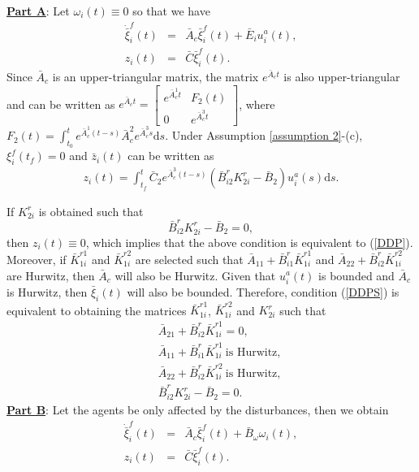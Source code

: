 \documentclass[12pt,draftcls,onecolumn]{IEEEtran}
\begin{document}
\underline{\textbf{Part A}}: Let  $\omega_i(t)\equiv 0$ so that we have
\begin{eqnarray*}
\dot{\bar \xi}_i^f(t)&=&\bar A_c\bar\xi_i^f(t)+\bar E_iu_i^a(t),\\
 z_i(t)&=&\bar C\bar \xi_i^f(t).\nonumber
\end{eqnarray*}
Since $\bar A_c$ is an upper-triangular matrix, the matrix $e^{\bar A_ct}$ is also upper-triangular and can be written  as 
$e^{\bar A_ct}=\begin{bmatrix}e^{\bar A_c^1t}&F_2(t)\\0&e^{\bar A_c^3t} \end{bmatrix}$, where $F_2(t)=\int_{t_0}^{t}e^{\bar A_c^1(t-s)}\bar A_c^2e^{\bar A_c^3s}\text{d}s$. Under Assumption \ref{assumption 2}-(c), $\xi_i^f(t_f)=0$ and $\bar z_i(t)$ can be written as 
\begin{eqnarray}
 z_i(t)=\int_{t_f}^{t}\bar C_2e^{\bar A_c^3(t-s)}(\bar B_{i2}^rK_{2i}^{r}-\bar B_2)u_i^{a}(s) \text{d}s. \label{eq. 2.9}
\end{eqnarray}\par
If $ K_{2i}^{r}$ is obtained such that 
$$\bar B_{i2}^rK_{2i}^{r}-\bar B_2=0,$$
then  $ z_i(t)\equiv 0$, which implies that the above condition is equivalent to (\ref{DDP}). Moreover, if $\bar K_{1i}^{r1}$ and $\bar K_{1i}^{r2}$ are selected such that $\bar A_{11}+\bar B_{i1}^r \bar K_{1i}^{r1}$ and $ \bar A_{22}+\bar B_{i2 }^r\bar K_{1i}^{r2}$ are Hurwitz, then $\bar A_c$ will also be Hurwitz. Given that $u_i^a(t)$ is bounded and $\bar A_c$ is Hurwitz, then $\bar \xi_i(t)$ will also be bounded. Therefore, condition (\ref{DDPS}) is equivalent  to  obtaining the matrices $\bar K_{1i}^{r1}$, $\bar K_{1i}^{r2}$ and $K_{2i}^{r}$  such that
\begin{eqnarray}
&&\bar A_{21}+\bar B_{i2}^r \bar K_{1i}^{r1}=0, \label{const 1}\\
&&\bar A_{11}+\bar B_{i1}^r \bar K_{1i}^{r1}\  \text{is Hurwitz},\label{const 2} \\
&&  \bar A_{22}+\bar B_{i2 }^r\bar K_{1i}^{r2}\ \text{is Hurwitz},\label{const 3}\\
&& \bar B_{i2}^rK_{2i}^{r}-\bar B_{2}=0. \label{eq 6}
\end{eqnarray}
\underline{\textbf{Part B}}: Let the agents be only affected by the disturbances, then  we obtain
\begin{eqnarray}
\dot{\bar \xi}_i^f(t)&=&\bar A_{c}\bar\xi_i^f(t)+\bar B_{\omega}\omega_i(t),\label{eq. 2.8}\\
 z_i(t)&=&\bar C\bar \xi_i^f(t).\nonumber
\end{eqnarray}
\end{document}
